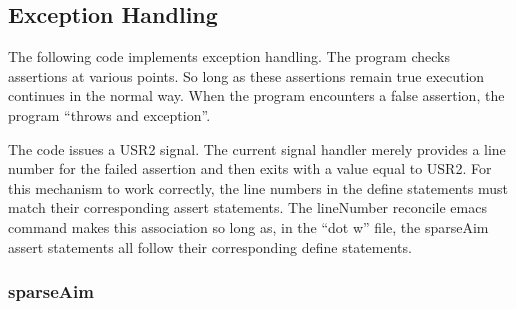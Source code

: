 \documentclass{article}
\begin{document}
\begin{flushleft}
\begin{minipage}{\linewidth}
\begin{list}{}{\setlength{\itemsep}{-\parsep}\setlength{\itemindent}{-\leftmargin}}
\item{}
\end{list}
\end{minipage}\vspace{4ex}
\end{flushleft}
\subsection{Exception Handling}
\label{sec:exceptionHandling}
The following code implements exception handling.  The program checks
assertions at various points.  So long as these assertions remain true
execution continues in the normal way.  When the program encounters
a false assertion, the program ``throws and exception''.  

The code issues
a USR2 signal.  The current signal handler merely provides a line number
for the failed assertion and then exits with a value equal to USR2.
For this mechanism to work correctly, the line numbers in the define
statements must match their corresponding assert statements.
The lineNumber reconcile emacs command makes this association so long as, in
the ``dot w'' file, 
the sparseAim assert statements all follow their 
corresponding define statements.

\subsubsection{sparseAim}
\end{document}
